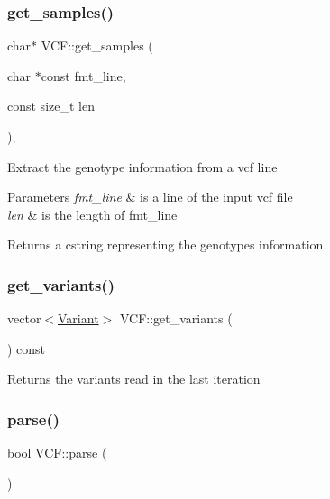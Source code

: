 \subsubsection{\texorpdfstring{get\_samples()}{get\_samples()}}
{\footnotesize\ttfamily char$\ast$ V\+C\+F\+::get\+\_\+samples (\begin{DoxyParamCaption}\item[{char $\ast$const}]{fmt\+\_\+line,  }\item[{const size\+\_\+t}]{len }\end{DoxyParamCaption})\hspace{0.3cm}{\ttfamily [inline]}, {\ttfamily [private]}}

Extract the genotype information from a vcf line


\begin{DoxyParams}{Parameters}
{\em fmt\+\_\+line} & is a line of the input vcf file \\
\hline
{\em len} & is the length of fmt\+\_\+line \\
\hline
\end{DoxyParams}
\begin{DoxyReturn}{Returns}
a cstring representing the genotypes information 
\end{DoxyReturn}
\mbox{\label{classVCF_aea647d1c90eed8db57aae07325f3510c}} 
\subsubsection{\texorpdfstring{get\_variants()}{get\_variants()}}
{\footnotesize\ttfamily vector$<$\mbox{\hyperlink{classVariant}{Variant}}$>$ V\+C\+F\+::get\+\_\+variants (\begin{DoxyParamCaption}{ }\end{DoxyParamCaption}) const\hspace{0.3cm}{\ttfamily [inline]}}

\begin{DoxyReturn}{Returns}
the variants read in the last iteration 
\end{DoxyReturn}
\mbox{\label{classVCF_a543c2a6f7f1ab2a2c4aa47cdb6792b66}} 
\subsubsection{\texorpdfstring{parse()}{parse()}}
{\footnotesize\ttfamily bool V\+C\+F\+::parse (\begin{DoxyParamCaption}{ }\end{DoxyParamCaption})\hspace{0.3cm}{\ttfamily [inline]}}

